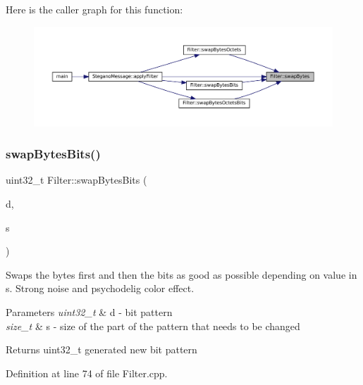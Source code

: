 Here is the caller graph for this function\+:\nopagebreak
\begin{figure}[H]
\begin{center}
\leavevmode
\includegraphics[width=350pt]{classFilter_a9d4f7bd12f0bfdf200abf53d166fd944_icgraph}
\end{center}
\end{figure}
\mbox{\label{classFilter_a42c3e8f730c64a1bcdf187dc0a09082d}} 
\subsubsection{\texorpdfstring{swapBytesBits()}{swapBytesBits()}}
{\footnotesize\ttfamily uint32\+\_\+t Filter\+::swap\+Bytes\+Bits (\begin{DoxyParamCaption}\item[{uint32\+\_\+t}]{d,  }\item[{size\+\_\+t}]{s }\end{DoxyParamCaption})\hspace{0.3cm}{\ttfamily [static]}}



Swaps the bytes first and then the bits as good as possible depending on value in s. Strong noise and psychodelig color effect. 


\begin{DoxyParams}{Parameters}
{\em uint32\+\_\+t} & d -\/ bit pattern \\
\hline
{\em size\+\_\+t} & s -\/ size of the part of the pattern that needs to be changed \\
\hline
\end{DoxyParams}
\begin{DoxyReturn}{Returns}
uint32\+\_\+t generated new bit pattern 
\end{DoxyReturn}


Definition at line 74 of file Filter.\+cpp.

